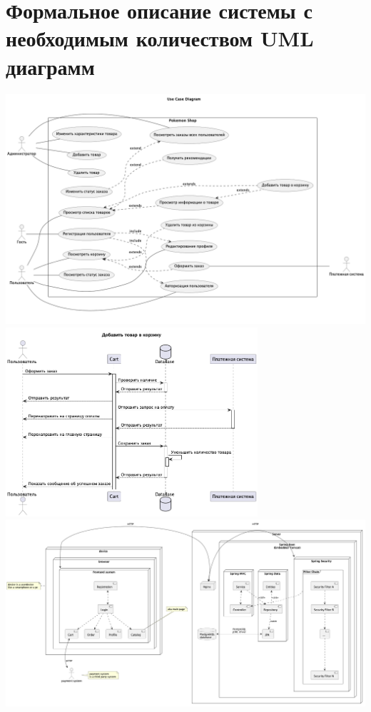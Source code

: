 \documentclass[12pt,onecolumn]{article}
\begin{document}
\section{Формальное описание системы с необходимым количеством UML диаграмм}
\includegraphics[width=\textwidth]{image/usecase.png}\\
\includegraphics[width=0.7\textwidth]{image/sequence.png}\\
\includegraphics[width=\textwidth]{image/component_diagram.png}\\
\end{document}
